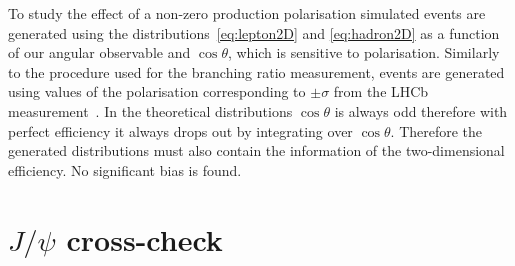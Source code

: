 To study the effect of a non-zero \Lb production polarisation simulated events are generated 
using the distributions~\ref{eq:lepton2D} and \ref{eq:hadron2D} as a function of our angular
observable and $\cos\theta$, which is sensitive to polarisation.
Similarly to the procedure used for the branching ratio measurement, events are generated using
values of the polarisation corresponding to $\pm \sigma$ from the LHCb measurement~\cite{Aaij:2013oxa}.
In the theoretical distributions $\cos \theta$ is always odd therefore with perfect efficiency it always
drops out by integrating over $\cos\theta$. Therefore the generated distributions must also contain
the information of the two-dimensional efficiency. No significant bias is found.





\section{$J/\psi$ cross-check}


